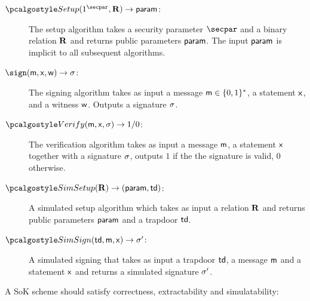 \begin{description}
    \item[$\signsetup(1^\secpar, \REL) \rightarrow  \param$:]
	The setup algorithm takes a security parameter $\secpar$ and a binary relation $\mathbf{R}$
	and returns public parameters $ \mathsf{param}$.  The input $ \mathsf{param}$ is implicit to all subsequent algorithms. 

    \item[$\sign(\mesage, \inp, \wit)  \rightarrow \signature$:]
The signing algorithm takes as input a message $ \mathsf{m} \in \{0,1\}^{*}$, 
a statement $\mathsf{x}$, and a witness $\mathsf{w}$.
	Outputs a signature $\mathsf{\sigma}$.

    \item[$\verify(\mesage, \inp, \signature) \rightarrow 1/ 0$:]
The verification algorithm takes as input 
 a message $\mathsf{m}$,  a statement $\mathsf{x}$ 
 together with a signature $\mathsf{\sigma}$,
	outputs $1$ if the the signature is valid, $0$ otherwise.
	
    \item[$\simsetup(\REL) \rightarrow (\param, \td)$:]
    	A simulated setup algorithm which takes as input a relation $\mathbf{R}$ and returns public parameters $\mathsf{param}$ and a trapdoor $\mathsf{td}$. 
    	
   \item[$\simsign(\td, \mesage, \inp) \rightarrow \signature'$:]
   	A simulated signing  that takes as input  a trapdoor $\mathsf{td}$, a message $\mathsf{m}$ and a statement $\mathsf{x}$ and returns a simulated signature $\mathsf{\sigma}'$.
\end{description}
 
A SoK scheme should satisfy correctness, extractability and simulatability:
   
